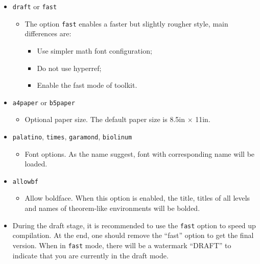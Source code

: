 \documentclass[allowbf]{beaulivre}
\newenvironment{tip}[1][Tip]{%
    \begin{tcolorbox}[breakable,
        enhanced,
        width = \textwidth,
        colback = paper, colbacktitle = paper,
        colframe = gray!50, boxrule=0.2mm,
        coltitle = black,
        fonttitle = \sffamily,
        attach boxed title to top left = {yshift=-\tcboxedtitleheight/2, xshift=.5cm},
        boxed title style = {boxrule=0pt, colframe=paper},
        before skip = 0.3cm,
        after skip = 0.3cm,
        top = 3mm,
        bottom = 3mm,
        title={\scshape\sffamily #1}]%
}{\end{tcolorbox}}
\begin{document}
\begin{itemize}
    \item \texttt{draft} or \texttt{fast}
        \begin{itemize}
            \item The option \verb|fast| enables a faster but slightly rougher style, main differences are:
            \begin{itemize}
                \item Use simpler math font configuration; 
                \item Do not use hyperref; 
                \item Enable the fast mode of \ProjLib{} toolkit.
            \end{itemize}
        \end{itemize}
    \item \texttt{a4paper} or \texttt{b5paper}
        \begin{itemize}
            \item Optional paper size. The default paper size is 8.5in $\times$ 11in.
        \end{itemize}
    \item \texttt{palatino}, \texttt{times}, \texttt{garamond}, \texttt{biolinum}
        \begin{itemize}
            \item Font options. As the name suggest, font with corresponding name will be loaded.
        \end{itemize}
    \item \texttt{allowbf}
        \begin{itemize}
            \item Allow boldface. When this option is enabled, the title, titles of all levels and names of theorem-like environments will be bolded.
        \end{itemize}
\end{itemize}

\begin{tip}
    \begin{itemize}
        \item During the draft stage, it is recommended to use the \verb|fast| option to speed up compilation. At the end, one should remove the ``fast'' option to get the final version. When in \verb|fast| mode, there will be a watermark ``DRAFT'' to indicate that you are currently in the draft mode.
    \end{itemize}
\end{tip}
\end{document}
